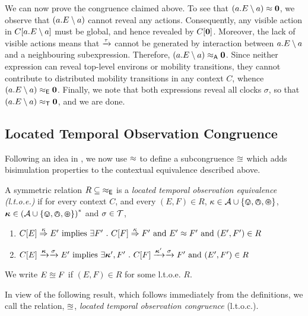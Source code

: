 \documentclass[orivec,envcountsame]{llncs}
\begin{document}
We can now prove the congruence claimed above. To see that $\left(a. E
\setminus {a}\right) \approx \textbf{0}$, we observe that $\left(a. E \setminus {a}\right)$
cannot reveal any actions. Consequently, any visible action in $C[a. E
\setminus {a}]$ must be global, and hence revealed by $C[\textbf{0}]$. Moreover, the lack of
visible actions means that $\xrightarrow{\tau}$ cannot be generated by interaction
between $a. E \setminus {a}$ and a neighbouring subexpression. Therefore,
$\left(a. E \setminus {a}\right) \mathrel{\approx_{\textsf{A}}} \textbf{0}$. Since neither expression can
reveal top-level environs or mobility transitions, they cannot contribute to
distributed mobility transitions in any context $C$, whence $\left(a. E
\setminus {a}\right) \mathrel{\approx_{\textsf{E}}} \textbf{0}$. Finally, we note that both expressions reveal all
clocks $\sigma$, so that $\left(a. E \setminus {a}\right) \mathrel{\approx_{\textsf{T}}} \textbf{0}$, and we
are done.


\subsection{Located Temporal Observation Congruence}
\label{sec:ltoc}

Following an idea in \cite{case}, we now use $\approx$ to define a
subcongruence $\approxeq$ which adds bisimulation properties to the
contextual equivalence described above.

\begin{definition}

A symmetric relation $R\mathrel{\subseteq}\mathop{\mathrel{\approx_{\textsf{E}}}}$ is a
\emph{located temporal observation equivalence (l.t.o.e.)} if for every
context $C$, and every $(E,F) \in R$, $\kappa \in \text{$\mathcal{A}$} \cup
\{ \varovee , \varowedge , \varoast \}$, $\vec{\kappa} \in \left(\actions \cup
\{ \tntin, \tntout, \tntopen \}\right)^*$ and $\sigma \in \text{$\mathcal{T}$}$,

\begin{enumerate}
\item
    $C[E] \stackrel{\kappa}{\Rightarrow} E' \mbox{ implies }
       \exists F' ~.~ C[F] \stackrel{\kappa}{\Rightarrow} F' \mbox{ and } E' \approx F' \mbox{ and } (E', F') \in R$ 
\item
    $C[E] \Does{\vec{\kappa}}\Does{\sigma} E' \mbox{ implies }
       \exists \vec{\kappa}', F' ~.~ 
       C[F] \Does{\vec{\kappa}'}\Does{\sigma} F' \mbox{ and } (E', F') \in R$
\end{enumerate}
We write $E \approxeq F$ if $(E,F) \in R$ for some l.t.o.e. $R$.
\end{definition}

In view of the following result, which follows immediately from the
definitions, we call the relation, $\approxeq$, \emph{located temporal
observation congruence} (l.t.o.c.).
\end{document}
